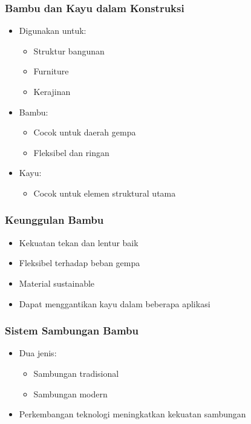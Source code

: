 \documentclass[../main.tex]{subfiles}
\begin{document}
\begin{frame}[mytitle=standard,t,mycolor=digiPH_gray,light]
	\frametitle{Bambu dan Kayu dalam Konstruksi}
	\begin{itemize}
		\item Digunakan untuk:
		      \begin{itemize}
			      \item Struktur bangunan
			      \item Furniture
			      \item Kerajinan
		      \end{itemize}
		\item Bambu:
		      \begin{itemize}
			      \item Cocok untuk daerah gempa
			      \item Fleksibel dan ringan
		      \end{itemize}
		\item Kayu:
		      \begin{itemize}
			      \item Cocok untuk elemen struktural utama
		      \end{itemize}
	\end{itemize}\end{frame}

\begin{frame}[mytitle=standard,t,mycolor=digiPH_cream,light]\frametitle{Keunggulan Bambu}
	\begin{itemize}
		\item Kekuatan tekan dan lentur baik
		\item Fleksibel terhadap beban gempa
		\item Material sustainable
		\item Dapat menggantikan kayu dalam beberapa aplikasi
	\end{itemize}\end{frame}

\begin{frame}[mytitle=standard,t,mycolor=digiPH_purple,dark]\frametitle{Sistem Sambungan Bambu}
	\begin{itemize}
		\item Dua jenis:
		      \begin{itemize}
			      \item Sambungan tradisional
			      \item Sambungan modern
		      \end{itemize}
		\item Perkembangan teknologi meningkatkan kekuatan sambungan
	\end{itemize}\end{frame}
\end{document}
